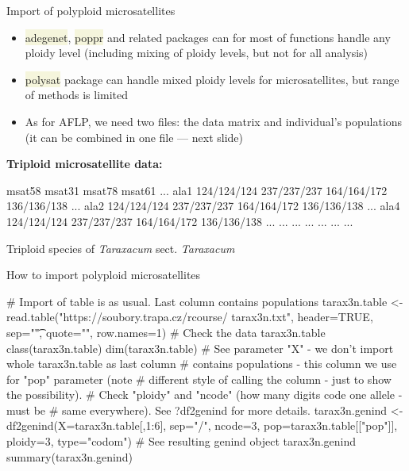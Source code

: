 \documentclass[compress, xelatex, 11pt, xcolor=svgnames, aspectratio=169,
	hyperref={
		bookmarks=true,
		unicode=true,
		colorlinks=true,
		pdftitle={Molecular data in R},
		plainpages=false,
		pdfauthor={Vojtech Zeisek},
		pdfsubject={Course about phylogeny and evolution in R},
		pdfcreator={XeLaTeX},
		pdfkeywords={R, evolution, phylogeny, molecular data},
		linkcolor=Crimson, %
		anchorcolor=Magenta, %
		citecolor=Magenta, %
		filecolor=Magenta, %
		menucolor=Magenta, %
		urlcolor=DodgerBlue, %
		},
	url={hyphens, lowtilde} %
	]{beamer}
\renewcommand{\texttt}[1]{\colorbox{Beige}{{\ttfamily #1}}}
\begin{document}
\begin{frame}[fragile]{Import of polyploid microsatellites}
	\vfill
	\begin{itemize}
		\item \texttt{adegenet}, \texttt{poppr} and related packages can for most of functions handle any ploidy level (including mixing of ploidy levels, but not for all analysis)
		\item \texttt{polysat} package can handle mixed ploidy levels for microsatellites, but range of methods is limited
		\item As for AFLP, we need two files: the data matrix and individual's populations (it can be combined in one file --- next slide)
	\end{itemize}
	\vfill
	\textbf{Triploid microsatellite data:}
	\vfil
	\begin{spluscode}
              msat58      msat31      msat78      msat61 ...
    ala1 124/124/124 237/237/237 164/164/172 136/136/138 ...
    ala2 124/124/124 237/237/237 164/164/172 136/136/138 ...
    ala4 124/124/124 237/237/237 164/164/172 136/136/138 ...
     ...         ...         ...         ...         ... ...
	\end{spluscode}
	\vfill
	\begin{footnotesize}
		Triploid species of \textit{Taraxacum} sect. \textit{Taraxacum}
	\end{footnotesize}
	\vfill
\end{frame}

\begin{frame}[fragile]{How to import polyploid microsatellites}
	\begin{spluscode}
    # Import of table is as usual. Last column contains populations
    tarax3n.table <- read.table("https://soubory.trapa.cz/rcourse/
      tarax3n.txt", header=TRUE, sep="\t", quote="", row.names=1)
    # Check the data
    tarax3n.table
    class(tarax3n.table)
    dim(tarax3n.table)
    # See parameter "X" - we don't import whole tarax3n.table as last column
    # contains populations - this column we use for "pop" parameter (note
    # different style of calling the column - just to show the possibility).
    # Check "ploidy" and "ncode" (how many digits code one allele - must be
    # same everywhere). See ?df2genind for more details.
    tarax3n.genind <- df2genind(X=tarax3n.table[,1:6], sep="/", ncode=3,
      pop=tarax3n.table[["pop"]], ploidy=3, type="codom")
    # See resulting genind object
    tarax3n.genind
    summary(tarax3n.genind)
	\end{spluscode}
\end{frame}
\end{document}
